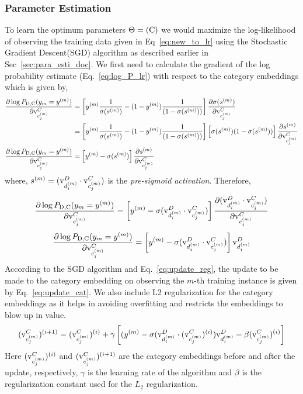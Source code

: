 \subsubsection{Parameter Estimation}
To learn the optimum parameters $\Theta=(\mathrm{C})$ we would maximize the log-likelihood of observing the training data given in Eq~\ref{eq:new_to_lr} using the Stochastic Gradient Descent(SGD) algorithm as described earlier in Sec~\ref{sec:para_esti_doc}. We first need to calculate the gradient of the log probability estimate (Eq.~\ref{eq:log_P_lr}) with respect to the category embeddings which is given by,
\begin{align}
\frac{\partial \log P_{\mathrm{D}, \mathrm{C}}(y_{m}=y^{(m)})} {\partial \mathrm{v}^{C}_{c^{(m)}_{j}}} &= \left[ y^{(m)}\frac{1}{\sigma(s^{(m)})} - (1-y^{(m)})\frac{1}{(1 - \sigma(s^{(m)}))}\right] \frac{\partial \sigma(s^{(m)})}{\partial \mathrm{v}^{C}_{c^{(m)}_{j}}} \\
&= \left[ y^{(m)}\frac{1}{\sigma(s^{(m)})} - (1-y^{(m)})\frac{1}{(1 - \sigma(s^{(m)}))}\right] \left[\sigma(s^{(m)})(1-\sigma(s^{(m)}))\right]\frac{\partial s^{(m)}}{\partial \mathrm{v}^{C}_{c^{(m)}_{j}}} \\
\frac{\partial \log P_{\mathrm{D}, \mathrm{C}}(y_{m}=y^{(m)})} {\partial \mathrm{v}^{C}_{c^{(m)}_{j}}} &= \left[ y^{(m)} - \sigma(s^{(m)})\right] \frac{\partial s^{(m)}}{\partial \mathrm{v}^{C}_{c^{(m)}_{j}}}
\end{align}
where, $s^{(m)} = (\mathrm{v}^{D}_{d^{(m)}_{i}}\cdot \mathrm{v}^{C}_{c^{(m)}_{j}})$ is the \emph{pre-sigmoid activation}. Therefore,
\begin{equation}
\frac{\partial \log P_{\mathrm{D}, \mathrm{C}}(y_{m}=y^{(m)})} {\partial \mathrm{v}^{C}_{c^{(m)}_{j}}} = \left[ y^{(m)} - \sigma(\mathrm{v}^{D}_{d^{(m)}_{i}}\cdot \mathrm{v}^{C}_{c^{(m)}_{j}})\right] \frac{\partial (\mathrm{v}^{D}_{d^{(m)}_{i}}\cdot \mathrm{v}^{C}_{c^{(m)}_{j}})}{\partial \mathrm{v}^{C}_{c^{(m)}_{j}}}
\end{equation}
\begin{equation}
\label{eq:grad_c}
\frac{\partial \log P_{\mathrm{D}, \mathrm{C}}(y_{m}=y^{(m)})} {\partial \mathrm{v}^{C}_{c^{(m)}_{j}}} = \left[ y^{(m)} - \sigma(\mathrm{v}^{D}_{d^{(m)}_{i}}\cdot \mathrm{v}^{C}_{c^{(m)}_{j}})\right] \mathrm{v}^{D}_{d^{(m)}_{i}}
\end{equation}
According to the SGD algorithm and Eq.~\ref{eq:update_reg}, the update to be made to the category embedding on observing the $m$-th training instance is given by Eq.~\ref{eq:update_cat}. We also include L2
regularization for the category embeddings as it helps in avoiding overfitting and restricts the embeddings to blow up in value.
\begin{equation}
\label{eq:update_cat}
(\mathrm{v}^{C}_{c^{(m)}_{j}})^{(i+1)} = (\mathrm{v}^{C}_{c^{(m)}_{j}})^{(i)} + \gamma \left[ ( y^{(m)} - \sigma(\mathrm{v}^{D}_{d^{(m)}_{i}}\cdot (\mathrm{v}^{C}_{c^{(m)}_{j}})^{(i)}) \mathrm{v}^{D}_{d^{(m)}_{i}} -\beta(\mathrm{v}^{C}_{c^{(m)}_{j}})^{(i)} \right]
\end{equation}
Here $(\mathrm{v}^{C}_{c^{(m)}_{j}})^{(i)}$ and $(\mathrm{v}^{C}_{c^{(m)}_{j}})^{(i+1)}$ are the category embeddings before and after the update, respectively, $\gamma$ is the learning rate of the algorithm and $\beta$ is the regularization constant used for the $L_{2}$ regularization. 

